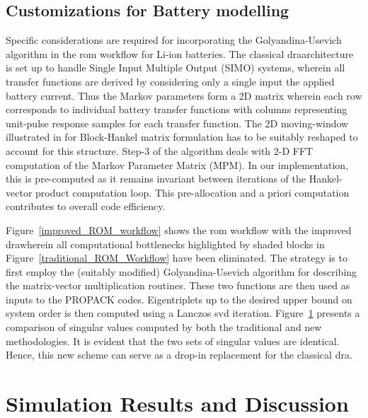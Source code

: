 \subsection{Customizations for Battery modelling}

Specific considerations are required for incorporating the Golyandina-Usevich
algorithm in the \gls{rom} workflow for Li-ion batteries. The classical
\gls{dra}architecture is set up to handle Single Input Multiple Output
(SIMO) systems, wherein all transfer functions are derived by considering
only a single input \textendash{} the applied battery current. Thus
the Markov parameters form a 2D matrix wherein each row corresponds
to individual battery transfer functions with columns representing
unit-pulse response samples for each transfer function. The 2D moving-window
illustrated in \cite{GolyandinaKorobeynikovShlemovEtAl2015} for
Block-Hankel matrix formulation has to be suitably reshaped to account
for this structure. Step-3 of the algorithm deals with 2-D FFT computation
of the Markov Parameter Matrix (MPM). In our implementation, this
is pre-computed as it remains invariant between iterations of the
Hankel-vector product computation loop. This pre-allocation and a
priori computation contributes to overall code efficiency.

Figure~\ref{improved_ROM_workflow} shows the \gls{rom} workflow with
the improved \gls{dra}wherein all computational bottlenecks highlighted
by shaded blocks in Figure~\ref{traditional_ROM_Workflow} have
been eliminated. The strategy is to first employ the (suitably modified)
Golyandina-Usevich algorithm for describing the matrix-vector multiplication
routines. These two functions are then used as inputs to the PROPACK
codes. Eigentriplets up to the desired upper bound on system order
is then computed using a Lanczos \gls{svd} iteration. Figure~\ref{svdcompare}
presents a comparison of singular values computed by both the  traditional
and new methodologies. It is evident that the two sets of singular
values are identical. Hence, this new scheme can serve as a drop-in
replacement for the classical \gls{dra}.

\begin{figure}
	\caption{}
	\label{svdcompare}
\end{figure}

\section{Simulation Results and Discussion\label{sec:Results} }

